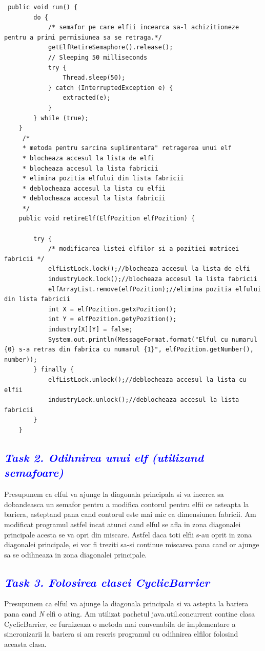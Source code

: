 \documentclass{article}
\begin{document}
\begin{lstlisting}
 public void run() {
        do {
            /* semafor pe care elfii incearca sa-l achizitioneze pentru a primi permisiunea sa se retraga.*/
            getElfRetireSemaphore().release();
            // Sleeping 50 milliseconds
            try {
                Thread.sleep(50);
            } catch (InterruptedException e) {
                extracted(e);
            }
        } while (true);
    }
     /*
     * metoda pentru sarcina suplimentara" retragerea unui elf
     * blocheaza accesul la lista de elfi
     * blocheaza accesul la lista fabricii
     * elimina pozitia elfului din lista fabricii
     * deblocheaza accesul la lista cu elfii
     * deblocheaza accesul la lista fabricii
     */
    public void retireElf(ElfPozition elfPozition) {

        try {
            /* modificarea listei elfilor si a pozitiei matricei fabricii */
            elfListLock.lock();//blocheaza accesul la lista de elfi
            industryLock.lock();//blocheaza accesul la lista fabricii
            elfArrayList.remove(elfPozition);//elimina pozitia elfului din lista fabricii
            int X = elfPozition.getxPozition();
            int Y = elfPozition.getyPozition();
            industry[X][Y] = false;
            System.out.println(MessageFormat.format("Elful cu numarul {0} s-a retras din fabrica cu numarul {1}", elfPozition.getNumber(), number));
        } finally {
            elfListLock.unlock();//deblocheaza accesul la lista cu elfii
            industryLock.unlock();//deblocheaza accesul la lista fabricii
        }
    }
\end{lstlisting}
\textcolor{blue}{\subsection{\itshape\textcolor{blue}{Task 2. Odihnirea unui elf (utilizand semafoare) }}}
Presupunem ca elful va ajunge la diagonala principala si va incerca sa dobandeasca un semafor pentru a modifica contorul pentru elfii ce asteapta la bariera, asteptand pana cand contorul este mai mic ca dimensiunea fabricii. Am modificat programul astfel incat atunci cand elful se afla in zona diagonalei principale acesta se va opri din miscare. Astfel daca toti elfii s-au oprit in zona diagonalei principale, ei vor fi treziti sa-si continue miscarea pana cand or ajunge sa se odihneaza in zona diagonalei principale.\\

\textcolor{blue}{\subsection{\itshape\textcolor{blue}{Task 3. Folosirea clasei CyclicBarrier }}}
Presupunem ca elful va ajunge la diagonala principala si va astepta la bariera pana cand \emph{N} elfi o ating. Am utilizat pachetul java.util.concurrent contine clasa CyclicBarrier, ce furnizeaza o metoda mai convenabila de implementare a sincronizarii la bariera si am rescris programul cu odihnirea elfilor folosind aceasta clasa.
\end{document}
